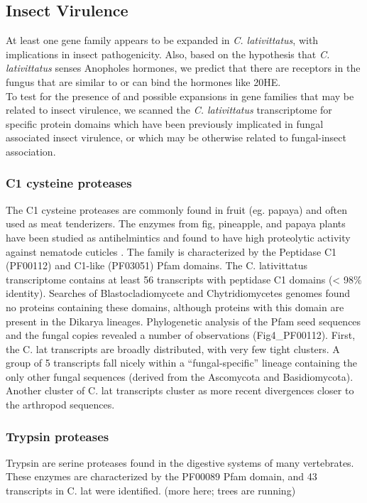 \subsection*{Insect Virulence} 
At least one gene family appears to be expanded in \textit{C. lativittatus}, with implications in insect pathogenicity. Also, based on the hypothesis that \textit{C. lativittatus} senses Anopholes hormones, we predict that there are receptors in the fungus that are similar to or can bind the hormones like 20HE. \\
\indent To test for the presence of and possible expansions in gene families that may be related to insect virulence, we scanned the \textit{C. lativittatus} transcriptome for specific protein domains which have been previously implicated in fungal associated insect virulence, or which may be otherwise related to fungal-insect association. \\
\subsubsection*{C1 cysteine proteases} 
The C1 cysteine proteases are commonly found in fruit (eg. papaya) and often used as meat tenderizers. The enzymes from fig, pineapple, and papaya plants have been studied as antihelmintics and found to have high proteolytic activity against nematode cuticles \cite{Stepek2004}. The family is characterized by the Peptidase C1 (PF00112) and C1-like (PF03051) Pfam domains. The C. lativittatus transcriptome contains at least 56 transcripts with peptidase C1 domains (< 98\% identity). Searches of Blastocladiomycete and Chytridiomycetes genomes found no proteins containing these domains, although proteins with this domain are present in the Dikarya lineages. Phylogenetic analysis of the Pfam seed sequences and the fungal copies revealed a number of observations (Fig4\_PF00112). First, the C. lat transcripts are broadly distributed, with very few tight clusters. A group of 5 transcripts fall nicely within a “fungal-specific” lineage containing the only other fungal sequences (derived from the Ascomycota and Basidiomycota). Another cluster of C. lat transcripts cluster as more recent divergences closer to the arthropod sequences. \\
\subsubsection*{Trypsin proteases}
Trypsin are serine proteases found in the digestive systems of many vertebrates. These enzymes are characterized by the PF00089 Pfam domain, and 43 transcripts in C. lat were identified. (more here; trees are running)
